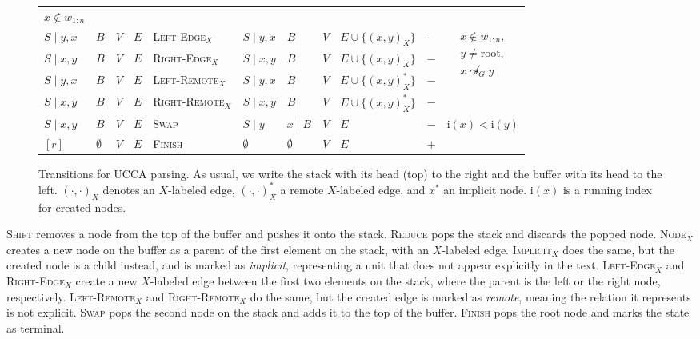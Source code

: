 \documentclass[11pt]{article}
\begin{document}
\begin{figure*}
\begin{adjustbox}{width=\textwidth,margin=3pt,frame}
\begin{tabular}{llll|l|llllc|c}
$x \not\in w_{1:n}$ \\
\cline{11-11}
$S \;|\; y,x$ & $B$ & $V$ & $E$ & \textsc{Left-Edge$_X$} & $S \;|\; y,x$ & $B$ & $V$ & $E \cup \{ (x,y)_X \}$ & $-$ &
\multirow{4}{50pt}{$\begin{aligned}
x \not\in w_{1:n},\\
y \neq \mathrm{root},\\
x \not\leadsto_G y
\end{aligned}$} \\
$S \;|\; x,y$ & $B$ & $V$ & $E$ & \textsc{Right-Edge$_X$} & $S \;|\; x,y$ & $B$ & $V$ & $E \cup \{ (x,y)_X \}$ & $-$ & \\
$S \;|\; y,x$ & $B$ & $V$ & $E$ & \textsc{Left-Remote$_X$} & $S \;|\; y,x$ & $B$ & $V$ & $E \cup \{ (x,y)_X^* \}$ & $-$ & \\
$S \;|\; x,y$ & $B$ & $V$ & $E$ & \textsc{Right-Remote$_X$} & $S \;|\; x,y$ & $B$ & $V$ & $E \cup \{ (x,y)_X^* \}$ & $-$ & \\
\cline{11-11}
$S \;|\; x,y$ & $B$ & $V$ & $E$ & \textsc{Swap} & $S \;|\; y$ & $x \;|\; B$ & $V$ & $E$ & $-$ &
$\mathrm{i}(x) < \mathrm{i}(y)$ \\
\cline{11-11}
$[r]$ & $\emptyset$ & $V$ & $E$ & \textsc{Finish} & $\emptyset$ & $\emptyset$ & $V$ & $E$ & $+$ & \\
\end{tabular}
\end{adjustbox}
\caption{\label{fig:transitions}
Transitions for UCCA parsing.
As usual, we write the stack with its head (top) to the right and the buffer with its head to the left.
$(\cdot,\cdot)_X$ denotes an $X$-labeled edge, $(\cdot,\cdot)_X^*$ a remote $X$-labeled edge, and $x^*$ an implicit node.
$\mathrm{i}(x)$ is a running index for created nodes.
}
\end{figure*}

\textsc{Shift} removes a node from the top of the buffer and pushes it onto the stack.
\textsc{Reduce} pops the stack and discards the popped node.
\textsc{Node$_X$} creates a new node on the buffer as a parent of the first element on the stack, with an $X$-labeled edge. \textsc{Implicit$_X$} does the same, but the created node is a child instead, and is marked as \textit{implicit}, representing a unit that does not appear explicitly in the text.
\textsc{Left-Edge$_X$} and \textsc{Right-Edge$_X$} create a new $X$-labeled edge between the first two elements on the stack, where the parent is the left or the right node, respectively. \textsc{Left-Remote$_X$} and \textsc{Right-Remote$_X$} do the same, but the created edge is marked as \textit{remote}, meaning the relation it represents is not explicit.
\textsc{Swap} pops the second node on the stack and adds it to the top of the buffer.
\textsc{Finish} pops the root node and marks the state as terminal.
\end{document}
